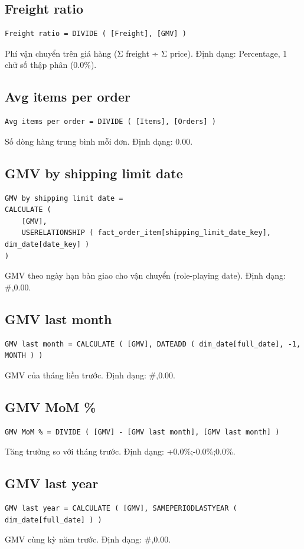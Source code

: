 \subsection*{Freight ratio}
\begin{lstlisting}[language={}]
Freight ratio = DIVIDE ( [Freight], [GMV] )
\end{lstlisting}
Phí vận chuyển trên giá hàng (Σ freight ÷ Σ price). Định dạng: Percentage, 1 chữ số thập phân (0.0\%).

\subsection*{Avg items per order}
\begin{lstlisting}[language={}]
Avg items per order = DIVIDE ( [Items], [Orders] )
\end{lstlisting}
Số dòng hàng trung bình mỗi đơn. Định dạng: 0.00.

\subsection*{GMV by shipping limit date}
\begin{lstlisting}[language={}]
GMV by shipping limit date =
CALCULATE (
    [GMV],
    USERELATIONSHIP ( fact_order_item[shipping_limit_date_key], dim_date[date_key] )
)
\end{lstlisting}
GMV theo ngày hạn bàn giao cho vận chuyển (role-playing date). Định dạng: \#,0.00.

\subsection*{GMV last month}
\begin{lstlisting}[language={}]
GMV last month = CALCULATE ( [GMV], DATEADD ( dim_date[full_date], -1, MONTH ) )
\end{lstlisting}
GMV của tháng liền trước. Định dạng: \#,0.00.

\subsection*{GMV MoM \%}
\begin{lstlisting}[language={}]
GMV MoM % = DIVIDE ( [GMV] - [GMV last month], [GMV last month] )
\end{lstlisting}
Tăng trưởng so với tháng trước. Định dạng: +0.0\%;-0.0\%;0.0\%.

\subsection*{GMV last year}
\begin{lstlisting}[language={}]
GMV last year = CALCULATE ( [GMV], SAMEPERIODLASTYEAR ( dim_date[full_date] ) )
\end{lstlisting}
GMV cùng kỳ năm trước. Định dạng: \#,0.00.

